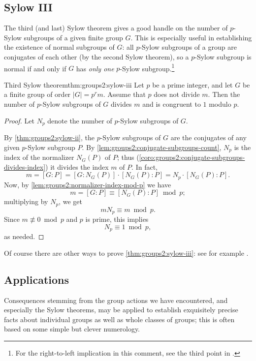 \subsection{Sylow III}
\label{subsec:groups2:sylow-iii}
The third (and last) Sylow theorem gives a good handle on the number
of $p$-Sylow subgroups of a given finite group $G$. This is especially
useful in establishing the existence of normal subgroups of $G$: all
$p$-Sylow subgroups of a group are conjugates of each other (by
the second Sylow theorem), so a $p$-Sylow subgroup is normal if and
only if $G$ has \emph{only one} $p$-Sylow
subgroup.\footnote{For the right-to-left implication in this comment,
  see the third point in .}
\begin{thm}{Third Sylow theorem}{thm:groups2:sylow-iii}
  Let $p$ be a prime integer, and let $G$ be a finite group of order
  $|G| = p^r m$. Assume that $p$ does not divide $m$. Then the number
  of $p$-Sylow subgroups of $G$ divides $m$ and is congruent to $1$
  modulo $p$.
\end{thm}
\begin{proof}
  Let $N_p$ denote the number of $p$-Sylow subgroups of $G$.

  By \cref{thm:groups2:sylow-ii}, the $p$-Sylow subgroups of $G$ are
  the conjugates of any given $p$-Sylow subgroup $P$. By
  \cref{lem:groups2:conjugate-subgroups-count}, $N_p$ is the index of
  the normalizer $N_G(P)$ of $P$; thus
  (\cref{coro:groups2:conjugate-subgroups-divides-index}) it divides
  the index $m$ of $P$. In fact,
  \[
    m = [G : P] = [G : N_G(P)] \cdot [N_G(P) : P] = N_p \cdot [N_G(P)
    : P].
  \]
  Now, by \cref{lem:groups2:normalizer-index-mod-p} we have
  \[
    m = [G : P] \equiv [N_G(P) : P] \bmod p;
  \]
  multiplying by $N_p$, we get
  \[
    mN_p \equiv m \bmod p.
  \]
  Since $m \not\equiv 0 \bmod p$ and $p$ is prime, this implies
  \[
    N_p \equiv 1 \bmod p,
  \]
  as needed.
\end{proof}
Of course there are other ways to prove \cref{thm:groups2:sylow-iii}:
see for example .

\subsection{Applications}
\label{subsec:groups2:applications}
Consequences stemming from the group actions we have encountered, and
especially the Sylow theorems, may be applied to establish exquisitely
precise facts about individual groups as well as whole classes of
groups; this is often based on some simple but clever numerology.

